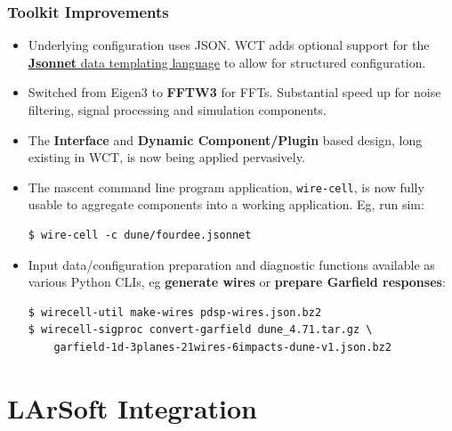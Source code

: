 \documentclass[xcolor=dvipsnames]{beamer}
\begin{document}
\begin{frame}
  \frametitle{Toolkit Improvements}
  \footnotesize
  \begin{itemize}
  \item Underlying configuration uses JSON.  WCT adds optional support
    for the \href{http://jsonnet.org/}{\textbf{Jsonnet} data templating language} to allow for structured configuration.
  \item Switched from Eigen3 to \textbf{FFTW3} for FFTs.  Substantial speed up
    for noise filtering, signal processing and simulation components.
  \item The \textbf{Interface} and \textbf{Dynamic Component/Plugin} based design, long existing in
    WCT, is now being applied pervasively.
  \item The nascent command line program application, \texttt{wire-cell}, is now fully usable to aggregate components into a working application. Eg, run sim:
\begin{verbatim}
$ wire-cell -c dune/fourdee.jsonnet
\end{verbatim}
  \item Input data/configuration preparation and diagnostic functions
    available as various Python CLIs, eg \textbf{generate wires} or \textbf{prepare
    Garfield responses}:
\begin{verbatim}
$ wirecell-util make-wires pdsp-wires.json.bz2
$ wirecell-sigproc convert-garfield dune_4.71.tar.gz \
    garfield-1d-3planes-21wires-6impacts-dune-v1.json.bz2
\end{verbatim}
  \end{itemize}

  
\end{frame}

\section{LArSoft Integration}

\begin{frame}
\end{frame}
\end{document}
